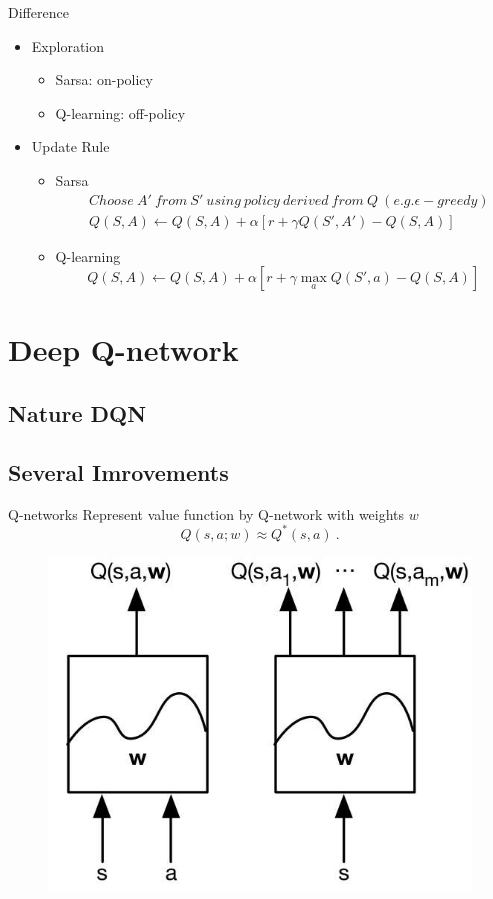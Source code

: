\documentclass{beamer}
\newcommand{\red}[1]{{\color{red} #1}}
\begin{document}
\begin{frame}{Difference}
  \begin{itemize}
  	\item Exploration
  		\begin{itemize}
  			\item Sarsa: on-policy
  			\item Q-learning: off-policy
  		\end{itemize}
  	\item Update Rule
	  	\begin{itemize}
	  		\item Sarsa
	  		\begin{equation}\nonumber
	  		\begin{aligned}
	  		& Choose~ A'~ from~ S'~ using~policy~derived~from~Q~(e.g. \epsilon-greedy) \\
	  		& Q(S,A) \leftarrow Q(S,A) + \alpha[r + \gamma Q(S', A') - Q(S,A)]
	  		\end{aligned}
	  		\end{equation}
	  		\item Q-learning
	  		\begin{equation}\nonumber
	  		Q(S,A) \leftarrow Q(S,A) + \alpha[r + \gamma \max_a Q(S', a) - Q(S,A)]
	  		\end{equation}
	  	\end{itemize}
  \end{itemize}
\end{frame}






\section{Deep Q-network}

\subsection{Nature DQN}
\subsection{Several Imrovements}

\begin{frame}{Q-networks}
Represent value function by \red{Q-network} with weights $w$
\begin{equation}
Q(s,a; w) \approx Q^*(s,a) ~.
\end{equation}

\begin{figure}[t]
	\includegraphics[width=0.4\columnwidth]{figures/q-network.jpg}
\end{figure}
\end{frame}
\end{document}
